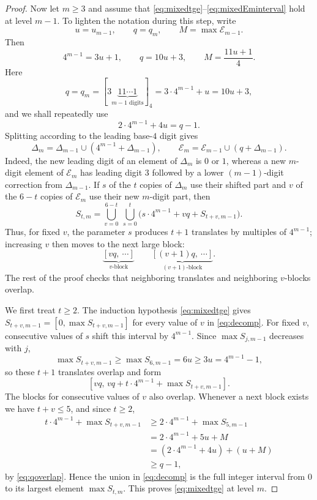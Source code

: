 \documentclass[12pt]{article}
\theoremstyle{plain}
\begin{document}
\begin{proof}
Now let $m\geq3$ and assume that
\eqref{eq:mixedtge}--\eqref{eq:mixedEminterval} hold at level $m-1$.
To lighten the notation during this step, write
\[
 u=u_{m-1},\qquad q=q_m,
 \qquad M=\max\mathcal E_{m-1}.
\]
Then
\[
 4^{m-1}=3u+1,\qquad q=10u+3,
 \qquad M=\frac{11u+1}{4}.
\]
Here
\begin{equation}\label{eq:qmdef}
 q=q_m=[3\underbrace{11\cdots1}_{m-1\text{ digits}}]_4
      =3\cdot4^{m-1}+u=10u+3,
\end{equation}
and we shall repeatedly use
\begin{equation}\label{eq:qoverlap}
 2\cdot4^{m-1}+4u=q-1.
\end{equation}
Splitting according to the leading base-$4$ digit gives
\[
 \Delta_m=\Delta_{m-1}\cup(4^{m-1}+\Delta_{m-1}),\qquad
 \mathcal E_m=\mathcal E_{m-1}\cup(q+\Delta_{m-1}).
\]
Indeed, the new leading digit of an element of $\Delta_m$ is $0$ or $1$,
whereas a new $m$-digit element of $\mathcal E_m$ has leading digit $3$
followed by a lower $(m-1)$-digit correction from $\Delta_{m-1}$.  If $s$ of
the $t$ copies of $\Delta_m$ use their shifted part and $v$ of the $6-t$
copies of $\mathcal E_m$ use their new $m$-digit part, then
\begin{equation}\label{eq:decomp}
 S_{t,m}=\bigcup_{v=0}^{6-t}\ \bigcup_{s=0}^{t}
 \bigl(s\cdot4^{m-1}+vq+S_{t+v,m-1}\bigr).
\end{equation}
Thus, for fixed $v$, the parameter $s$ produces $t+1$ translates by
multiples of $4^{m-1}$; increasing $v$ then moves to the next large block:
\[
 \underbrace{[vq,\ \cdots]}_{v\text{-block}}
 \qquad
 \underbrace{[(v+1)q,\ \cdots]}_{(v+1)\text{-block}}.
\]
The rest of the proof checks that neighboring translates and neighboring
$v$-blocks overlap.

We first treat $t\geq2$.  The induction hypothesis
\eqref{eq:mixedtge} gives $S_{t+v,m-1}=[0,\max S_{t+v,m-1}]$ for every
value of $v$ in \eqref{eq:decomp}.  For fixed $v$, consecutive values of
$s$ shift this interval by $4^{m-1}$.  Since $\max S_{j,m-1}$ decreases
with $j$,
\[
 \max S_{t+v,m-1}\geq\max S_{6,m-1}=6u
     \geq3u=4^{m-1}-1,
\]
so these $t+1$ translates overlap and form
\[
 [vq,\,vq+t\cdot4^{m-1}+\max S_{t+v,m-1}].
\]
The blocks for consecutive values of $v$ also overlap.  Whenever a next
block exists we have $t+v\leq5$, and since $t\geq2$,
\[
\begin{aligned}
 t\cdot4^{m-1}+\max S_{t+v,m-1}
 &\geq2\cdot4^{m-1}+\max S_{5,m-1}\\
 &=2\cdot4^{m-1}+5u+M\\
 &=(2\cdot4^{m-1}+4u)+(u+M)\\
 &\geq q-1,
\end{aligned}
\]
by \eqref{eq:qoverlap}.  Hence the union in \eqref{eq:decomp} is the
full integer interval from $0$ to its largest element $\max S_{t,m}$.
This proves \eqref{eq:mixedtge} at level $m$.


\end{proof}
\end{document}
